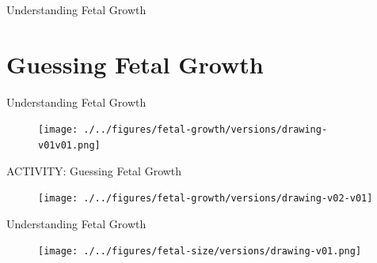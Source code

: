 

{
\begin{frame}{}

\BigSizeFont
Understanding Fetal Growth
\end{frame}
}




\section{Guessing Fetal Growth}



{
\begin{frame}{Understanding Fetal Growth}
      \begin{figure}
        \centering
        \texttt{[image: ./../figures/fetal-growth/versions/drawing-v01v01.png]}
      \end{figure}
\end{frame}
}





{
\begin{frame}{\faOptinMonster \faUsers ACTIVITY: Guessing Fetal Growth}
      \begin{figure}
        \centering
        \texttt{[image: ./../figures/fetal-growth/versions/drawing-v02-v01]}
      \end{figure}
\end{frame}
}



{
\begin{frame}{Understanding Fetal Growth}
      \begin{figure}
        \centering
        \texttt{[image: ./../figures/fetal-size/versions/drawing-v01.png]}
      \end{figure}
\end{frame}
}


